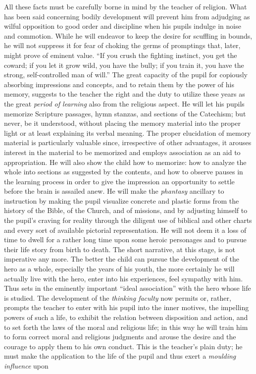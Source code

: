 All these facts must be carefully borne in mind by the teacher of religion. What has been said concerning bodily development will prevent him from adjudging as wilful opposition to good order and discipline when his pupils indulge in noise and commotion. While he will endeavor to keep the desire for scuffling in bounds, he will not suppress it for fear of choking the germs of promptings that, later, might prove of eminent value. “If you crush the fighting instinct, you get the coward; if you let it grow wild, you have the bully; if you train it, you have the strong, self-controlled man of will.” The great capacity of the pupil for copiously absorbing impressions and concepts, and to retain them by the power of his memory, suggests to the teacher the right and the duty to utilize these years as the great \emph{period of learning} also from the religious aspect. He will let his pupils memorize Scripture passages, hymn stanzas, and sections of
the Catechism; but never, be it understood, without placing the memory material into the proper light or at least explaining its verbal meaning. The proper elucidation of memory material is particularly valuable since, irrespective of other advantages, it arouses interest in the material to be memorized and employs association as an aid to appropriation. He will also show the child how to memorize: how to analyze the whole into sections as suggested by the contents, and how to observe pauses in the learning process in order to give the impression an opportunity to settle before the brain is assailed anew. He will make the \emph{phantasy} ancillary to instruction by making the pupil visualize concrete and plastic forms from the history of the Bible, of the Church, and of missions, and by adjusting himself to the pupil’s craving for reality through the diligent use of biblical and other charts and every sort of available pictorial representation. He will not deem it a loss of time to dwell for a rather long time upon some heroic personages and to pursue their life story from birth to death. The short narrative, at this stage, is not imperative any more. The better the child can pursue the development of the hero as a whole, especially the years of his youth, the more certainly he will actually live with the hero, enter into his experiences, feel sympathy with him. Thus sets in the eminently important “ideal association” with the hero whose life is studied. The development of the \emph{thinking faculty} now permits or, rather, prompts the teacher to enter with his pupil into the inner motives, the impelling powers of such a life, to exhibit the relation between disposition and action, and to set forth the laws of the moral and religious life; in this way he will train him to form correct moral and religious judgments and arouse the desire and the courage to apply them to his own conduct. This is the teacher’s plain duty; he must make the application to the life of the pupil and thus exert a \emph{moulding influence} upon
